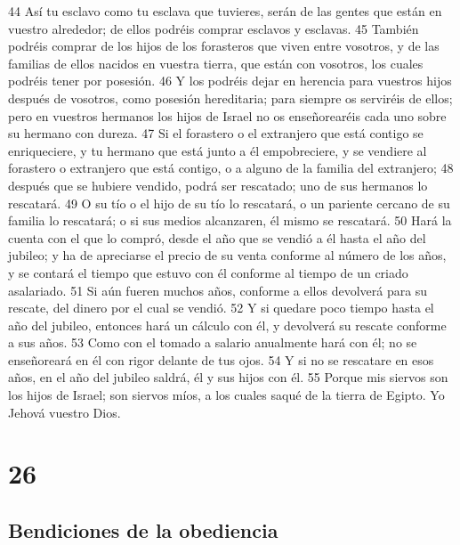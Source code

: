 44 Así tu esclavo como tu esclava que tuvieres, serán de las gentes que están en vuestro alrededor; de ellos podréis comprar esclavos y esclavas.
45 También podréis comprar de los hijos de los forasteros que viven entre vosotros, y de las familias de ellos nacidos en vuestra tierra, que están con vosotros, los cuales podréis tener por posesión.
46 Y los podréis dejar en herencia para vuestros hijos después de vosotros, como posesión hereditaria; para siempre os serviréis de ellos; pero en vuestros hermanos los hijos de Israel no os enseñorearéis cada uno sobre su hermano con dureza.
47 Si el forastero o el extranjero que está contigo se enriqueciere, y tu hermano que está junto a él empobreciere, y se vendiere al forastero o extranjero que está contigo, o a alguno de la familia del extranjero;
48 después que se hubiere vendido, podrá ser rescatado; uno de sus hermanos lo rescatará.
49 O su tío o el hijo de su tío lo rescatará, o un pariente cercano de su familia lo rescatará; o si sus medios alcanzaren, él mismo se rescatará.
50 Hará la cuenta con el que lo compró, desde el año que se vendió a él hasta el año del jubileo; y ha de apreciarse el precio de su venta conforme al número de los años, y se contará el tiempo que estuvo con él conforme al tiempo de un criado asalariado.
51 Si aún fueren muchos años, conforme a ellos devolverá para su rescate, del dinero por el cual se vendió.
52 Y si quedare poco tiempo hasta el año del jubileo, entonces hará un cálculo con él, y devolverá su rescate conforme a sus años.
53 Como con el tomado a salario anualmente hará con él; no se enseñoreará en él con rigor delante de tus ojos.
54 Y si no se rescatare en esos años, en el año del jubileo saldrá, él y sus hijos con él.
55 Porque mis siervos son los hijos de Israel; son siervos míos, a los cuales saqué de la tierra de Egipto. Yo Jehová vuestro Dios.  

\chapter{26}

\section{Bendiciones de la obediencia}

